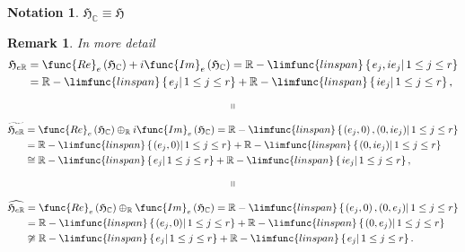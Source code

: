 \documentclass[aps,preprint]{revtex4}
\newtheorem{notation}[theorem]{Notation}
\newtheorem{remark}[theorem]{Remark}
\begin{document}
\begin{notation}
$\mathfrak{H}_{\mathbb{C}}\equiv \mathfrak{H}$
\end{notation}

\begin{remark}
In more detail 
\begin{align}
\mathfrak{H}_{e\mathbb{R}}& =\func{Re}_{e}\left( \mathfrak{H}_{\mathbb{C}%
}\right) +i\func{Im}_{e}\left( \mathfrak{H}_{\mathbb{C}}\right) =\mathbb{R}-%
\limfunc{linspan}\left\{ \left. e_{j},ie_{j}\right\vert 1\leq j\leq r\right\}
\\
& =\mathbb{R}-\limfunc{linspan}\left\{ \left. e_{j}\right\vert 1\leq j\leq
r\right\} +\mathbb{R}-\limfunc{linspan}\left\{ \left. ie_{j}\right\vert
1\leq j\leq r\right\} ,
\end{align}%
\begin{equation}
\shortparallel
\end{equation}%
\begin{align}
\widetilde{\mathfrak{H}_{e\mathbb{R}}}& =\func{Re}_{e}\left( \mathfrak{H}_{%
\mathbb{C}}\right) \oplus _{\mathbb{R}}i\func{Im}_{e}\left( \mathfrak{H}_{%
\mathbb{C}}\right) =\mathbb{R}-\limfunc{linspan}\left\{ \left. \left(
e_{j},0\right) ,\left( 0,ie_{j}\right) \right\vert 1\leq j\leq r\right\} \\
& =\mathbb{R}-\limfunc{linspan}\left\{ \left. \left( e_{j},0\right)
\right\vert 1\leq j\leq r\right\} +\mathbb{R}-\limfunc{linspan}\left\{
\left. \left( 0,ie_{j}\right) \right\vert 1\leq j\leq r\right\} \\
& \cong \mathbb{R}-\limfunc{linspan}\left\{ \left. e_{j}\right\vert 1\leq
j\leq r\right\} +\mathbb{R}-\limfunc{linspan}\left\{ \left.
ie_{j}\right\vert 1\leq j\leq r\right\} ,
\end{align}%
\begin{equation}
\shortparallel
\end{equation}%
\begin{align}
\widehat{\mathfrak{H}_{e\mathbb{R}}}& =\func{Re}_{e}\left( \mathfrak{H}_{%
\mathbb{C}}\right) \oplus _{\mathbb{R}}\func{Im}_{e}\left( \mathfrak{H}_{%
\mathbb{C}}\right) =\mathbb{R}-\limfunc{linspan}\left\{ \left. \left(
e_{j},0\right) ,\left( 0,e_{j}\right) \right\vert 1\leq j\leq r\right\} \\
& =\mathbb{R}-\limfunc{linspan}\left\{ \left. \left( e_{j},0\right)
\right\vert 1\leq j\leq r\right\} +\mathbb{R}-\limfunc{linspan}\left\{
\left. \left( 0,e_{j}\right) \right\vert 1\leq j\leq r\right\} \\
& \ncong \mathbb{R}-\limfunc{linspan}\left\{ \left. e_{j}\right\vert 1\leq
j\leq r\right\} +\mathbb{R}-\limfunc{linspan}\left\{ \left. e_{j}\right\vert
1\leq j\leq r\right\} .
\end{align}
\end{remark}
\end{document}
